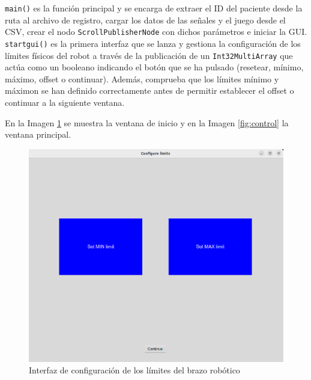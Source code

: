 \verb|main()| es la función principal y se encarga de extraer el ID del paciente desde la ruta al archivo de registro, cargar los datos de las señales y el juego desde el CSV, crear el nodo \verb|ScrollPublisherNode| con dichos parámetros e iniciar la GUI.
\verb|startgui()| es la primera interfaz que se lanza y gestiona la configuración de los límites físicos del robot a través de la publicación de un \verb|Int32MultiArray| que actúa como un booleano indicando el botón que se ha pulsado (resetear, mínimo, máximo, offset o continuar).
Además, comprueba que los límites mínimo y máximon se han definido correctamente antes de permitir establecer el offset o continuar a la siguiente ventana.

En la Imagen \ref{fig:config} se muestra la ventana de inicio y en la Imagen \ref{fig:control} la ventana principal.

\begin{figure}[ht!]
	\centering
	\begin{minipage}{0.85\linewidth}
		\centering
		\includegraphics[width=\linewidth]{figs/config_limits.png}
	\end{minipage}
	\caption[Interfaz de configuración de los límites del brazo robótico]{Interfaz de configuración de los límites del brazo robótico}
	\label{fig:config}
\end{figure}

